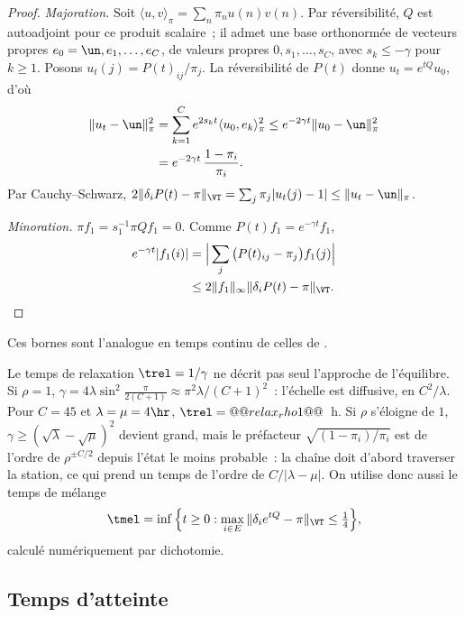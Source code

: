 \begin{proof}
\emph{Majoration.} Soit $\langle u,v\rangle_\pi=\sum_n\pi_nu(n)v(n)$. Par réversibilité, $Q$ est autoadjoint pour ce produit scalaire~; il admet une base orthonormée de vecteurs propres $e_0=\un,e_1,\dots,e_C$, de valeurs propres $0,s_1,\dots,s_C$, avec $s_k\leq-\gamma$ pour $k\geq1$. Posons $u_t(j)=P(t)_{ij}/\pi_j$. La réversibilité de $P(t)$ donne $u_t=e^{tQ}u_0$, d'où
\begin{align*}
\|u_t-\un\|_\pi^2&=\sum_{k=1}^Ce^{2s_kt}\langle u_0,e_k\rangle_\pi^2\leq e^{-2\gamma t}\|u_0-\un\|_\pi^2\\
&=e^{-2\gamma t}\,\frac{1-\pi_i}{\pi_i}.
\end{align*}
Par Cauchy--Schwarz, $2\|\delta_iP(t)-\pi\|_\VT=\sum_j\pi_j|u_t(j)-1|\leq\|u_t-\un\|_\pi$.

\emph{Minoration.} $\pi f_1=s_1^{-1}\pi Qf_1=0$. Comme $P(t)f_1=e^{-\gamma t}f_1$,
\begin{align*}
e^{-\gamma t}|f_1(i)|&=\Big|\sum_j\big(P(t)_{ij}-\pi_j\big)f_1(j)\Big|\\
&\leq2\|f_1\|_\infty\|\delta_iP(t)-\pi\|_\VT.\qedhere
\end{align*}
\end{proof}

Ces bornes sont l'analogue en temps continu de celles de \cite[chap.~12]{LP17}.

\begin{remarque}\label{rem:melange}
Le temps de relaxation $\trel=1/\gamma$ ne décrit pas seul l'approche de l'équilibre. Si $\rho=1$, $\gamma=4\lambda\sin^2\frac{\pi}{2(C+1)}\approx\pi^2\lambda/(C+1)^2$~: l'échelle est diffusive, en $C^2/\lambda$. Pour $C=45$ et $\lambda=\mu=4\hr$, $\trel=@@relax_rho1@@$~h. Si $\rho$ s'éloigne de $1$, $\gamma\geq(\sqrt\lambda-\sqrt\mu)^2$ devient grand, mais le préfacteur $\sqrt{(1-\pi_i)/\pi_i}$ est de l'ordre de $\rho^{\pm C/2}$ depuis l'état le moins probable~: la chaîne doit d'abord traverser la station, ce qui prend un temps de l'ordre de $C/|\lambda-\mu|$. On utilise donc aussi le temps de mélange
\[
\tmel=\inf\Big\{t\geq0:\max_{i\in E}\|\delta_ie^{tQ}-\pi\|_\VT\leq\tfrac14\Big\},
\]
calculé numériquement par dichotomie.
\end{remarque}

\subsection{Temps d'atteinte}\label{sec:atteinte}

